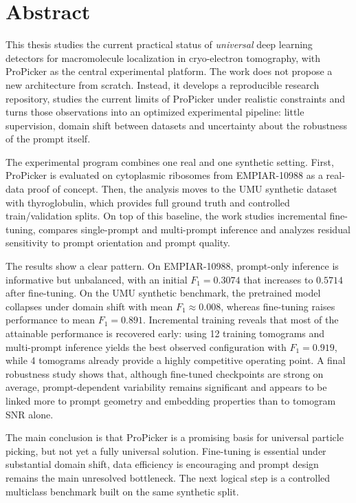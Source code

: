 \documentclass[12pt,a4paper]{report}
\begin{document}
\chapter*{Abstract}

This thesis studies the current practical status of \emph{universal} deep learning detectors for macromolecule localization in cryo-electron tomography, with ProPicker as the central experimental platform. The work does not propose a new architecture from scratch. Instead, it develops a reproducible research repository, studies the current limits of ProPicker under realistic constraints and turns those observations into an optimized experimental pipeline: little supervision, domain shift between datasets and uncertainty about the robustness of the prompt itself.

The experimental program combines one real and one synthetic setting. First, ProPicker is evaluated on cytoplasmic ribosomes from EMPIAR-10988 as a real-data proof of concept. Then, the analysis moves to the UMU synthetic dataset with thyroglobulin, which provides full ground truth and controlled train/validation splits. On top of this baseline, the work studies incremental fine-tuning, compares single-prompt and multi-prompt inference and analyzes residual sensitivity to prompt orientation and prompt quality.

The results show a clear pattern. On EMPIAR-10988, prompt-only inference is informative but unbalanced, with an initial \(F_1=0.3074\) that increases to \(0.5714\) after fine-tuning. On the UMU synthetic benchmark, the pretrained model collapses under domain shift with mean \(F_1 \approx 0.008\), whereas fine-tuning raises performance to mean \(F_1=0.891\). Incremental training reveals that most of the attainable performance is recovered early: using 12 training tomograms and multi-prompt inference yields the best observed configuration with \(F_1=0.919\), while 4 tomograms already provide a highly competitive operating point. A final robustness study shows that, although fine-tuned checkpoints are strong on average, prompt-dependent variability remains significant and appears to be linked more to prompt geometry and embedding properties than to tomogram SNR alone.

The main conclusion is that ProPicker is a promising basis for universal particle picking, but not yet a fully universal solution. Fine-tuning is essential under substantial domain shift, data efficiency is encouraging and prompt design remains the main unresolved bottleneck. The next logical step is a controlled multiclass benchmark built on the same synthetic split.
\end{document}
